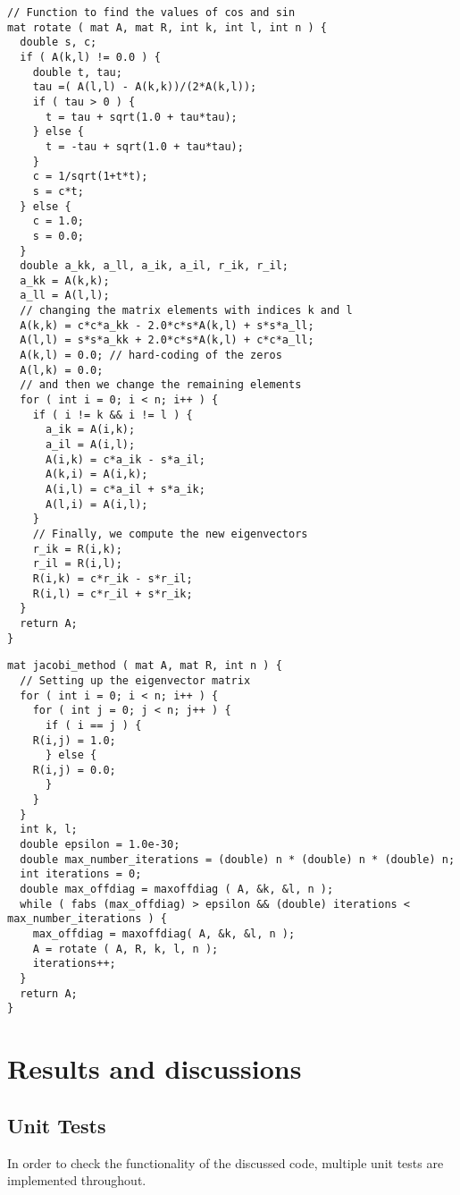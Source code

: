 \documentclass[10pt,showpacs,preprintnumbers,amsmath,amssymb,aps,prl,twocolumn,groupedaddress,superscriptaddress,showkeys]{revtex4-1}
\begin{document}
\begin{lstlisting}
// Function to find the values of cos and sin
mat rotate ( mat A, mat R, int k, int l, int n ) {
  double s, c;
  if ( A(k,l) != 0.0 ) {
    double t, tau;
    tau =( A(l,l) - A(k,k))/(2*A(k,l));
    if ( tau > 0 ) {
      t = tau + sqrt(1.0 + tau*tau);
    } else {
      t = -tau + sqrt(1.0 + tau*tau);
    }
    c = 1/sqrt(1+t*t);
    s = c*t;
  } else {
    c = 1.0;
    s = 0.0;
  }
  double a_kk, a_ll, a_ik, a_il, r_ik, r_il;
  a_kk = A(k,k);
  a_ll = A(l,l);
  // changing the matrix elements with indices k and l
  A(k,k) = c*c*a_kk - 2.0*c*s*A(k,l) + s*s*a_ll;
  A(l,l) = s*s*a_kk + 2.0*c*s*A(k,l) + c*c*a_ll;
  A(k,l) = 0.0; // hard-coding of the zeros
  A(l,k) = 0.0;
  // and then we change the remaining elements
  for ( int i = 0; i < n; i++ ) {
    if ( i != k && i != l ) {
      a_ik = A(i,k);
      a_il = A(i,l);
      A(i,k) = c*a_ik - s*a_il;
      A(k,i) = A(i,k);
      A(i,l) = c*a_il + s*a_ik;
      A(l,i) = A(i,l);
    }
    // Finally, we compute the new eigenvectors
    r_ik = R(i,k);
    r_il = R(i,l);
    R(i,k) = c*r_ik - s*r_il;
    R(i,l) = c*r_il + s*r_ik;
  }
  return A;
}
\end{lstlisting}
\begin{lstlisting}
mat jacobi_method ( mat A, mat R, int n ) {
  // Setting up the eigenvector matrix
  for ( int i = 0; i < n; i++ ) {
    for ( int j = 0; j < n; j++ ) {
      if ( i == j ) {
	R(i,j) = 1.0;
      } else {
	R(i,j) = 0.0;
      }
    }
  }
  int k, l;
  double epsilon = 1.0e-30;
  double max_number_iterations = (double) n * (double) n * (double) n;
  int iterations = 0;
  double max_offdiag = maxoffdiag ( A, &k, &l, n );
  while ( fabs (max_offdiag) > epsilon && (double) iterations < max_number_iterations ) {
    max_offdiag = maxoffdiag( A, &k, &l, n );
    A = rotate ( A, R, k, l, n );
    iterations++;
  }
  return A;
}
\end{lstlisting}

\section{Results and discussions}
\subsection{Unit Tests}
In order to check the functionality of the discussed code, multiple unit tests are implemented throughout. 
\end{document}
